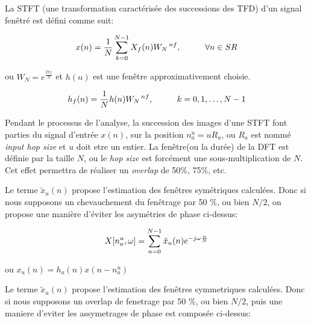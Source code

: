 \vspace{0.4cm}

La STFT (une transformation caractérisée des successions des TFD) d'un signal fenêtré est défini comme suit:

\begin{equation}
    x(n) = \frac{1}{N}\sum_{ k = 0 }^{ N-1 } X_f (n)W_N \hspace{0.05cm}^{ nf}, \hspace{1cm} \forall n \in SR 
\end{equation}

ou \hspace{0.1cm} $ W_N = e ^ {\frac{2\pi j}{N}} $ \hspace{0.1cm} et $ h(n) $ est une fenêtre approximativement choisie.

\begin{equation}
    h_f(n) = \frac{1}{N} h(n) W_N \hspace{0.05cm} ^{nf},\hspace{1cm}  k = 0, 1, \dots, N - 1 
\end{equation}

Pendant le processus de l'analyse, la succession des images d'une STFT font parties du signal d'entrée $x(n)$, sur la position $n_a^u = uR_a$, ou $R_a$ est nommé \textit{input hop size} et $u$ doit etre un entier. La fenêtre(ou la durée) de la DFT est définie par la taille $N$, ou le \textit{hop size} est forcément une sous-multiplication de $N$. Cet effet permettra de réaliser un \textit{overlap} de 50\%, 75\%, etc.

Le terme $\tilde{x}_u(n)$ propose l'estimation des fenêtres symétriques calculées. Donc si nous supposons un chevauchement du fenêtrage par 50 \%, ou bien $N/2$, on propose une manière d'éviter les asymétries de phase ci-dessus:  

\begin{equation}
    X[n_a^u, \omega] = \sum_{n=0} ^{N-1} \tilde{x}_u(n) e^{-j \omega \frac{n}{N}} \vspace{0.5cm} 
\end{equation}

\hspace{5cm} ou \hspace{1cm} ${x}_u(n) = h_a(n) x(n-n_a^u)$ 

Le terme $\tilde{x}_u(n)$ propose l'estimation des fenêtres symmetriques calculées. Donc si nous supposons un overlap de fenetrage par 50 \%, ou bien $N/2$, puis une maniere d'eviter les assymetrages de phase est composée ci-dessus:  

